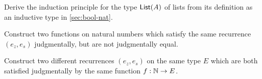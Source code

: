 \documentclass[hott-all.tex]{subfiles}
\begin{document}
% 
% 
% 
% 
% 
% 
\sectionExercises
% 
\begin{ex}
  Derive the induction principle for the type $\mathsf{List}(A)$ of lists from its definition as an inductive type in \cref{sec:bool-nat}.
\end{ex}
% 
\begin{ex}
  Construct two functions on natural numbers which satisfy the same recurrence $(e_z, e_s)$ judgmentally, but are not judgmentally equal.
\end{ex}
% 
\begin{ex}
  Construct two different recurrences $(e_z,e_s)$ on the same type $E$ which are both satisfied judgmentally by the same function $f:\mathbb{N}\to E$.
\end{ex}
\end{document}
